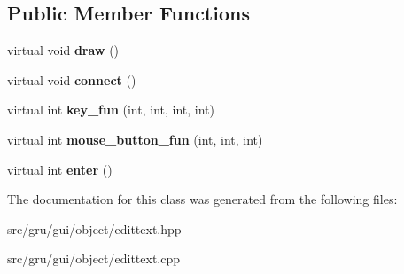 \subsection*{\-Public \-Member \-Functions}
\begin{DoxyCompactItemize}
\item 
\hypertarget{classglutpp_1_1gui_1_1object_1_1edittext_a6667510174711dd4718f8f8b07b89a6e}{virtual void {\bfseries draw} ()}\label{classglutpp_1_1gui_1_1object_1_1edittext_a6667510174711dd4718f8f8b07b89a6e}

\item 
\hypertarget{classglutpp_1_1gui_1_1object_1_1edittext_aacbbfc6f239db6356d83de334f6b0bdc}{virtual void {\bfseries connect} ()}\label{classglutpp_1_1gui_1_1object_1_1edittext_aacbbfc6f239db6356d83de334f6b0bdc}

\item 
\hypertarget{classglutpp_1_1gui_1_1object_1_1edittext_a88d4a62bd971978e1b60711859b4390d}{virtual int {\bfseries key\-\_\-fun} (int, int, int, int)}\label{classglutpp_1_1gui_1_1object_1_1edittext_a88d4a62bd971978e1b60711859b4390d}

\item 
\hypertarget{classglutpp_1_1gui_1_1object_1_1edittext_ae7decbc3c95b939cd78d782c48702bec}{virtual int {\bfseries mouse\-\_\-button\-\_\-fun} (int, int, int)}\label{classglutpp_1_1gui_1_1object_1_1edittext_ae7decbc3c95b939cd78d782c48702bec}

\item 
\hypertarget{classglutpp_1_1gui_1_1object_1_1edittext_a654792733884b42cba054e6a84894876}{virtual int {\bfseries enter} ()}\label{classglutpp_1_1gui_1_1object_1_1edittext_a654792733884b42cba054e6a84894876}

\end{DoxyCompactItemize}


\-The documentation for this class was generated from the following files\-:\begin{DoxyCompactItemize}
\item 
src/gru/gui/object/edittext.\-hpp\item 
src/gru/gui/object/edittext.\-cpp\end{DoxyCompactItemize}
